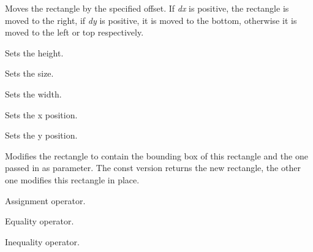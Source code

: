 

Moves the rectangle by the specified offset. If {\it dx} is positive, the
rectangle is moved to the right, if {\it dy} is positive, it is moved to the
bottom, otherwise it is moved to the left or top respectively.


\label{wxrectsetheight}


Sets the height.


\label{wxrectsetsize}


Sets the size.




\label{wxrectsetwidth}


Sets the width.


\label{wxrectsetx}


Sets the x position.


\label{wxrectsety}


Sets the y position.


\label{wxrectunion}



Modifies the rectangle to contain the bounding box of this rectangle and the
one passed in as parameter. The const version returns the new rectangle, the
other one modifies this rectangle in place.


\label{wxrectassign}


Assignment operator.


\label{wxrectequal}


Equality operator.


\label{wxrectnotequal}


Inequality operator.

